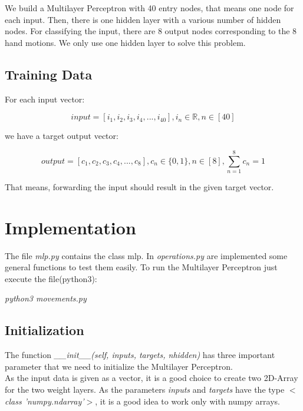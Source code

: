 \documentclass[10pt,a4paper]{article}
\begin{document}
	We build a Multilayer Perceptron with 40 entry nodes, that means one node for each input. Then, there is one hidden layer with a various number of hidden nodes. For classifying the input, there are 8 output nodes corresponding to the 8 hand motions. We only use one hidden layer to solve this problem.

	\subsection{Training Data}							%
	For each input vector:
	\begin{center}

		\begin{equation}
		input = [i_1,i_2,i_3,i_4,...,i_{40}], i_n \in  \mathbb{R},n \in [40]
		\end{equation}
	\end{center}
	we have a target output vector:
	\begin{center}
		\begin{equation}
		 output = [c_1,c_2,c_3,c_4,...,c_8], c_n \in \{0,1\}, n \in [8],\sum_{n=1}^{8} c_n  = 1 
		 \end{equation}  
	\end{center}
	That means, forwarding the input should result in the given target vector. 
	\section{Implementation}
	The file \textit{mlp.py} contains the class mlp. In \textit{operations.py} are implemented some general functions to test them easily.
	To run the Multilayer Perceptron just execute the file(python3):
	\begin{center}
			\textit{python3 movements.py}
	\end{center}
	\subsection{Initialization}								%
	The function \textit{ \_\_init\_\_(self, inputs, targets, nhidden)} has three important parameter that we need to initialize the Multilayer Perceptron. \\
	As the input data is given as a vector, it is a good choice to create two 2D-Array for the two weight layers. As the parameters \textit{inputs} and \textit{targets} have the type \textit{$<$class 'numpy.ndarray'$>$}, it is a good idea to work only with numpy arrays. \\
\end{document}
